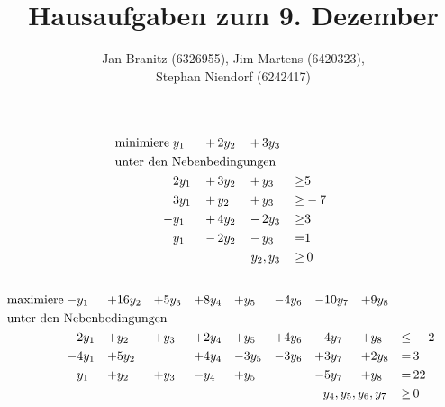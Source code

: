 \documentclass[10pt,a4paper,oneside,ngerman,numbers=noenddot]{scrartcl}
\begin{document}
\author{Jan Branitz (6326955), Jim Martens (6420323),\\
Stephan Niendorf (6242417)}
\title{Hausaufgaben zum 9. Dezember}
\maketitle
\section{} %
	\subsection{} %
		\begin{alignat*}{4}
			\text{minimiere}\; & y_{1} \,&+&\, 2y_{2} \,&+&\, 3y_{3} && \\
			\multicolumn{8}{l}{\text{unter den Nebenbedingungen}} && \\
			\;& 2y_{1} \,&+&\, 3y_{2} \,&+&\, y_{3} \,&\geq & 5 \\
			\;& 3y_{1} \,&+&\, y_{2} \,&+&\, y_{3} \,&\geq & -7 \\
			\;-& y_{1} \,&+&\, 4y_{2} \,&-&\, 2y_{3} \,&\geq & 3 \\
			\;& y_{1} \,&-&\, 2y_{2} \,&-&\, y_{3} \,&=& 1 \\
			\multicolumn{6}{r}{$y_{2}, y_{3}$} \,&\geq &\, 0
		\end{alignat*}
	\subsection{} %
		\begin{alignat*}{9}
			\text{maximiere}\; -& y_{1} &+& 16y_{2} &+& 5y_{3} &+& 8y_{4} &+& y_{5} &-& 4y_{6} &-& 10y_{7} &+& 9y_{8} &&  \\
			\multicolumn{18}{l}{\text{unter den Nebenbedingungen}} && \\
			& 2y_{1} &+& y_{2} &+& y_{3} &+& 2y_{4} &+& y_{5} &+& 4y_{6} &-& 4y_{7} &+& y_{8} &\leq &\, -2 \\
			-& 4y_{1} &+& 5y_{2} && &+& 4y_{4} &-& 3y_{5} &-& 3y_{6} &+& 3y_{7} &+& 2y_{8} &=&\, 3 \\
			& y_{1} &+& y_{2} &+& y_{3} &-& y_{4} &+& y_{5} && &-& 5y_{7} &+& y_{8} &=&\, 22 \\
			\multicolumn{16}{r}{$y_{4}, y_{5}, y_{6}, y_{7}$} \,&\geq &\, 0
		\end{alignat*}
\section{} %
\end{document}
